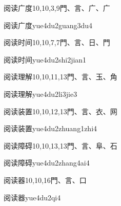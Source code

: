 \begin{entry}{阅读广度}{10,10,3,9}{⾨、⾔、⼴、⼴}
  \begin{phonetics}{阅读广度}{yue4du2guang3du4}
  \end{phonetics}
\end{entry}

\begin{entry}{阅读时间}{10,10,7,7}{⾨、⾔、⽇、⾨}
  \begin{phonetics}{阅读时间}{yue4du2shi2jian1}
  \end{phonetics}
\end{entry}

\begin{entry}{阅读理解}{10,10,11,13}{⾨、⾔、⽟、⾓}
  \begin{phonetics}{阅读理解}{yue4du2li3jie3}
  \end{phonetics}
\end{entry}

\begin{entry}{阅读装置}{10,10,12,13}{⾨、⾔、⾐、⽹}
  \begin{phonetics}{阅读装置}{yue4du2zhuang1zhi4}
  \end{phonetics}
\end{entry}

\begin{entry}{阅读障碍}{10,10,13,13}{⾨、⾔、⾩、⽯}
  \begin{phonetics}{阅读障碍}{yue4du2zhang4ai4}
  \end{phonetics}
\end{entry}

\begin{entry}{阅读器}{10,10,16}{⾨、⾔、⼝}
  \begin{phonetics}{阅读器}{yue4du2qi4}
  \end{phonetics}
\end{entry}


